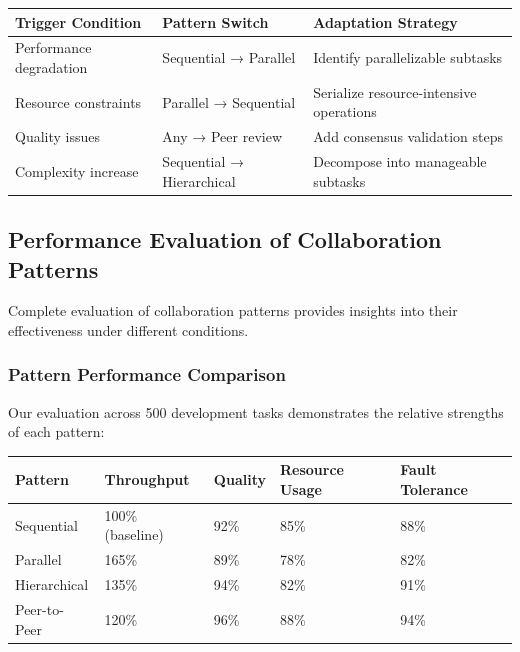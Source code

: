 \begin{center}
\begin{tabular}{@{}lll@{}}
\toprule
\textbf{Trigger Condition} & \textbf{Pattern Switch} & \textbf{Adaptation Strategy} \\
\midrule
Performance degradation & Sequential → Parallel & Identify parallelizable subtasks \\
Resource constraints & Parallel → Sequential & Serialize resource-intensive operations \\
Quality issues & Any → Peer review & Add consensus validation steps \\
Complexity increase & Sequential → Hierarchical & Decompose into manageable subtasks \\
\bottomrule
\end{tabular}
\end{center}

\subsection*{Performance Evaluation of Collaboration Patterns}

Complete evaluation of collaboration patterns provides insights into their effectiveness under different conditions.

\subsubsection*{Pattern Performance Comparison}

Our evaluation across 500 development tasks demonstrates the relative strengths of each pattern:

\begin{center}
\begin{tabular}{@{}lllll@{}}
\toprule
\textbf{Pattern} & \textbf{Throughput} & \textbf{Quality} & \textbf{Resource Usage} & \textbf{Fault Tolerance} \\
\midrule
Sequential & 100\% (baseline) & 92\% & 85\% & 88\% \\
Parallel & 165\% & 89\% & 78\% & 82\% \\
Hierarchical & 135\% & 94\% & 82\% & 91\% \\
Peer-to-Peer & 120\% & 96\% & 88\% & 94\% \\
\bottomrule
\end{tabular}
\end{center}

